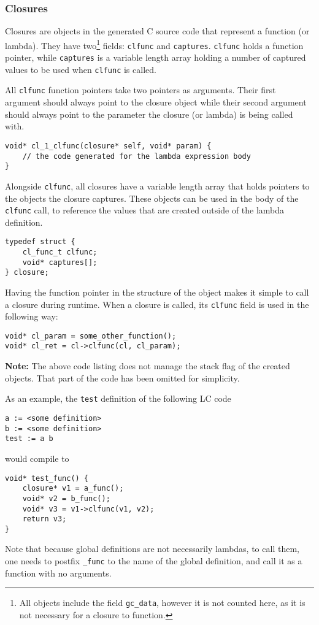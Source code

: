 \documentclass[12pt]{article}
\begin{document}
\subsubsection{Closures}

Closures are objects in the generated C source code that represent a function
(or lambda). They have two\footnote{All objects include the field
\texttt{gc\_data}, however it is not counted here, as it is not necessary for a
closure to function.} fields: \verb$clfunc$ and \verb$captures$. \verb$clfunc$
holds a function pointer, while \verb$captures$ is a variable length array
holding a number of captured values to be used when \verb$clfunc$ is called.

All \verb$clfunc$ function pointers take two pointers as arguments. Their first
argument should always point to the closure object while their second argument
should always point to the parameter the closure (or lambda) is being called
with.
\vspace{1em}
\\\noindent\begin{minipage}{\textwidth}
\begin{lstlisting}
void* cl_1_clfunc(closure* self, void* param) {
    // the code generated for the lambda expression body
}
\end{lstlisting}
\end{minipage}

Alongside \verb$clfunc$, all closures have a variable length array that holds
pointers to the objects the closure captures. These objects can be used in the
body of the \verb$clfunc$ call, to reference the values that are created outside
of the lambda definition.

\begin{lstlisting}
typedef struct {
    cl_func_t clfunc;
    void* captures[];
} closure;
\end{lstlisting}

Having the function pointer in the structure of the object makes it simple to
call a closure during runtime. When a closure is called, its \verb$clfunc$ field
is used in the following way:
\begin{lstlisting}
void* cl_param = some_other_function();
void* cl_ret = cl->clfunc(cl, cl_param); 
\end{lstlisting}
\textbf{Note:} The above code listing does not manage the stack flag of the
created objects. That part of the code has been omitted for simplicity.

As an example, the \verb$test$ definition of the following LC code
\begin{lstlisting}
a := <some definition>
b := <some definition>
test := a b
\end{lstlisting}
would compile to
\begin{lstlisting}
void* test_func() {
    closure* v1 = a_func();
    void* v2 = b_func();
    void* v3 = v1->clfunc(v1, v2);
    return v3;
}
\end{lstlisting}
Note that because global definitions are not necessarily lambdas, to call them,
one needs to postfix \verb$_func$ to the name of the global definition, and call
it as a function with no arguments.
\end{document}
